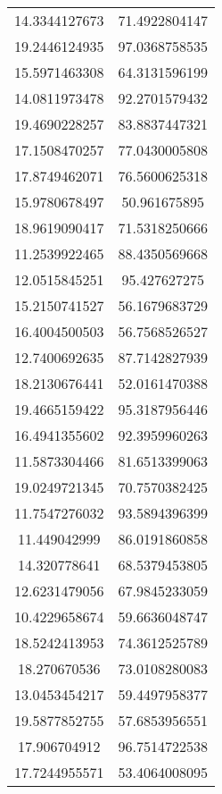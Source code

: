 \begin{table}
\begin{tabular}{cc}
14.3344127673 & 71.4922804147 \\
19.2446124935 & 97.0368758535 \\
15.5971463308 & 64.3131596199 \\
14.0811973478 & 92.2701579432 \\
19.4690228257 & 83.8837447321 \\
17.1508470257 & 77.0430005808 \\
17.8749462071 & 76.5600625318 \\
15.9780678497 & 50.961675895 \\
18.9619090417 & 71.5318250666 \\
11.2539922465 & 88.4350569668 \\
12.0515845251 & 95.427627275 \\
15.2150741527 & 56.1679683729 \\
16.4004500503 & 56.7568526527 \\
12.7400692635 & 87.7142827939 \\
18.2130676441 & 52.0161470388 \\
19.4665159422 & 95.3187956446 \\
16.4941355602 & 92.3959960263 \\
11.5873304466 & 81.6513399063 \\
19.0249721345 & 70.7570382425 \\
11.7547276032 & 93.5894396399 \\
11.449042999 & 86.0191860858 \\
14.320778641 & 68.5379453805 \\
12.6231479056 & 67.9845233059 \\
10.4229658674 & 59.6636048747 \\
18.5242413953 & 74.3612525789 \\
18.270670536 & 73.0108280083 \\
13.0453454217 & 59.4497958377 \\
19.5877852755 & 57.6853956551 \\
17.906704912 & 96.7514722538 \\
17.7244955571 & 53.4064008095 \\
\end{tabular}
\end{table}

